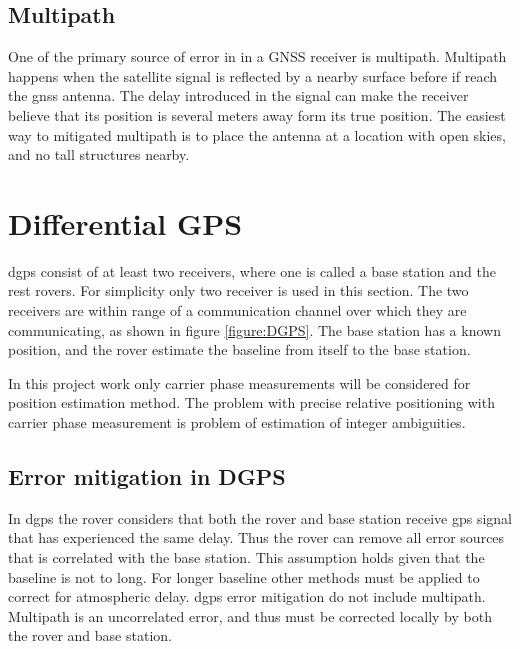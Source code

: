\subsection{Multipath}
One of the primary source of error in in a GNSS receiver is multipath. Multipath happens when the satellite signal is reflected by a nearby surface before if reach the \gls{gnss} antenna. The delay introduced in the signal can make the receiver believe that its position is several meters away form its true position. The easiest way to mitigated multipath is to place the antenna at a location with open skies, and no tall structures nearby.
\section{Differential GPS}
\acrfull{dgps} consist of at least two receivers, where one is called a base station and the rest rovers. For simplicity only two receiver is used in this section. The two receivers are within range of a communication channel over which they are communicating, as shown in figure \ref{figure:DGPS}. The base station has a known position, and the rover estimate the baseline from itself to the base station.

In this project work only carrier phase measurements will be considered for position estimation method.
The problem with precise relative positioning with carrier phase measurement is problem of estimation of integer ambiguities.


\subsection{Error mitigation in DGPS} \label{ss: Error mitigation DGPS}
In \gls{dgps} the rover considers that both the rover and base station receive \gls{gps} signal that has experienced the same delay. Thus the rover can remove all error sources that is correlated with the base station. This assumption holds given that the baseline is not to long. For longer baseline other methods must be applied to correct for atmospheric delay. \gls{dgps} error mitigation do not include multipath. Multipath is an uncorrelated error, and thus must be corrected locally by both the rover and base station.



\cleardoublepage